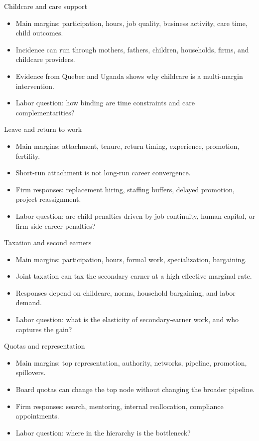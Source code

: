 \documentclass[aspectratio=169,11pt]{beamer}
\begin{document}
\begin{frame}{Childcare and care support}
\begin{itemize}
    \item Main margins: participation, hours, job quality, business activity, care time, child outcomes.
    \item Incidence can run through mothers, fathers, children, households, firms, and childcare providers.
    \item Evidence from Quebec and Uganda shows why childcare is a multi-margin intervention.
    \item Labor question: how binding are time constraints and care complementarities?
\end{itemize}
\end{frame}

\begin{frame}{Leave and return to work}
\begin{itemize}
    \item Main margins: attachment, tenure, return timing, experience, promotion, fertility.
    \item Short-run attachment is not long-run career convergence.
    \item Firm responses: replacement hiring, staffing buffers, delayed promotion, project reassignment.
    \item Labor question: are child penalties driven by job continuity, human capital, or firm-side career penalties?
\end{itemize}
\end{frame}

\begin{frame}{Taxation and second earners}
\begin{itemize}
    \item Main margins: participation, hours, formal work, specialization, bargaining.
    \item Joint taxation can tax the secondary earner at a high effective marginal rate.
    \item Responses depend on childcare, norms, household bargaining, and labor demand.
    \item Labor question: what is the elasticity of secondary-earner work, and who captures the gain?
\end{itemize}
\end{frame}

\begin{frame}{Quotas and representation}
\begin{itemize}
    \item Main margins: top representation, authority, networks, pipeline, promotion, spillovers.
    \item Board quotas can change the top node without changing the broader pipeline.
    \item Firm responses: search, mentoring, internal reallocation, compliance appointments.
    \item Labor question: where in the hierarchy is the bottleneck?
\end{itemize}
\end{frame}
\end{document}
